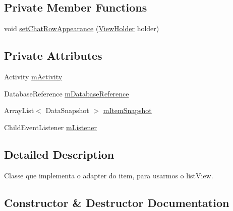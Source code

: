 \subsection*{Private Member Functions}
\begin{DoxyCompactItemize}
\item 
void \mbox{\hyperlink{classbr_1_1unb_1_1cic_1_1mp_1_1marketmaster_1_1ItensAdapter_a9b46799adc00f8540dd5577b8ed85971}{set\+Chat\+Row\+Appearance}} (\mbox{\hyperlink{classbr_1_1unb_1_1cic_1_1mp_1_1marketmaster_1_1ItensAdapter_1_1ViewHolder}{View\+Holder}} holder)
\end{DoxyCompactItemize}
\subsection*{Private Attributes}
\begin{DoxyCompactItemize}
\item 
Activity \mbox{\hyperlink{classbr_1_1unb_1_1cic_1_1mp_1_1marketmaster_1_1ItensAdapter_a3c6b4c35fbd603b64b459a60ae9e2108}{m\+Activity}}
\item 
Database\+Reference \mbox{\hyperlink{classbr_1_1unb_1_1cic_1_1mp_1_1marketmaster_1_1ItensAdapter_abb24e47174697519a2847e9044440bb8}{m\+Database\+Reference}}
\item 
Array\+List$<$ Data\+Snapshot $>$ \mbox{\hyperlink{classbr_1_1unb_1_1cic_1_1mp_1_1marketmaster_1_1ItensAdapter_a737ef683a4485f097f6d6ab16338c6e6}{m\+Item\+Snapshot}}
\item 
Child\+Event\+Listener \mbox{\hyperlink{classbr_1_1unb_1_1cic_1_1mp_1_1marketmaster_1_1ItensAdapter_a9db3896eb6fea6165fa26673a04e96d9}{m\+Listener}}
\end{DoxyCompactItemize}


\subsection{Detailed Description}
Classe que implementa o adapter do item, para usarmos o list\+View. 

\subsection{Constructor \& Destructor Documentation}
\mbox{\label{classbr_1_1unb_1_1cic_1_1mp_1_1marketmaster_1_1ItensAdapter_aec9acb282d404c0b9a153118a4d8c66f}} 
